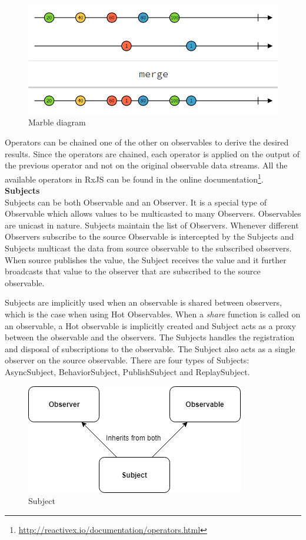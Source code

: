 \begin{figure}[!h]
	\centering
	\includegraphics[scale=0.5,trim=0 0 0 0]{images/operator-marble-diagram.png}
	\caption{Marble diagram}
	\label{fig:operator-marble-diagram}
\end{figure}

Operators can be chained one of the other on observables to derive the desired results. Since the operators are chained, each operator is applied on the output of the previous operator and not on the original observable data streams. All the available operators in RxJS can be found in the online documentation\footnote{\url{http://reactivex.io/documentation/operators.html}}.
\\
\textbf{Subjects}
\\
Subjects can be both Observable and an Observer\cite{reactiveSubjects}. It is a special type of Observable which allows values to be multicasted to many Observers. Observables are unicast in nature. Subjects maintain the list of Observers. Whenever different Observers subscribe to the source Observable is intercepted by the Subjects and Subjects multicast the data from source observable to the subscribed observers. When source publishes the value, the Subject receives the value and it further broadcasts that value to the observer that are subscribed to the source observable. 


Subjects are implicitly used when an observable is shared between observers, which is the case when using Hot Observables. When a \textit{share} function is called on an observable, a Hot observable is implicitly created and Subject acts as a proxy between the observable and the observers. The Subjects handles the registration and disposal of subscriptions to the observable. The Subject also acts as a single observer on the source observable. There are four types of Subjects: AsyncSubject, BehaviorSubject, PublishSubject and ReplaySubject.

\begin{figure}[!h]
	\centering
	\includegraphics[scale=0.5,trim=0 0 0 0]{images/subjects.png}
	\caption{Subject}
	\label{fig:subject-diagram}
\end{figure}

